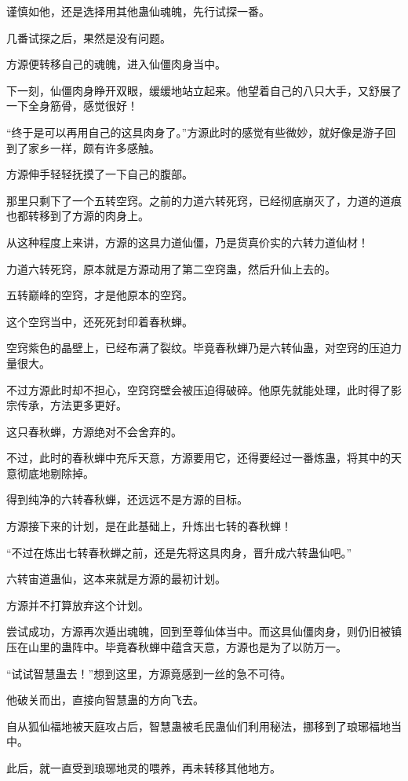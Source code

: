 \begin{this_body}
谨慎如他，还是选择用其他蛊仙魂魄，先行试探一番。

几番试探之后，果然是没有问题。

方源便转移自己的魂魄，进入仙僵肉身当中。

下一刻，仙僵肉身睁开双眼，缓缓地站立起来。他望着自己的八只大手，又舒展了一下全身筋骨，感觉很好！

“终于是可以再用自己的这具肉身了。”方源此时的感觉有些微妙，就好像是游子回到了家乡一样，颇有许多感触。

方源伸手轻轻抚摸了一下自己的腹部。

那里只剩下了一个五转空窍。之前的力道六转死窍，已经彻底崩灭了，力道的道痕也都转移到了方源的肉身上。

从这种程度上来讲，方源的这具力道仙僵，乃是货真价实的六转力道仙材！

力道六转死窍，原本就是方源动用了第二空窍蛊，然后升仙上去的。

五转巅峰的空窍，才是他原本的空窍。

这个空窍当中，还死死封印着春秋蝉。

空窍紫色的晶壁上，已经布满了裂纹。毕竟春秋蝉乃是六转仙蛊，对空窍的压迫力量很大。

不过方源此时却不担心，空窍窍壁会被压迫得破碎。他原先就能处理，此时得了影宗传承，方法更多更好。

这只春秋蝉，方源绝对不会舍弃的。

不过，此时的春秋蝉中充斥天意，方源要用它，还得要经过一番炼蛊，将其中的天意彻底地剔除掉。

得到纯净的六转春秋蝉，还远远不是方源的目标。

方源接下来的计划，是在此基础上，升炼出七转的春秋蝉！

“不过在炼出七转春秋蝉之前，还是先将这具肉身，晋升成六转蛊仙吧。”

六转宙道蛊仙，这本来就是方源的最初计划。

方源并不打算放弃这个计划。

尝试成功，方源再次遁出魂魄，回到至尊仙体当中。而这具仙僵肉身，则仍旧被镇压在山里的蛊阵中。毕竟春秋蝉中蕴含天意，方源也是为了以防万一。

“试试智慧蛊去！”想到这里，方源竟感到一丝的急不可待。

他破关而出，直接向智慧蛊的方向飞去。

自从狐仙福地被天庭攻占后，智慧蛊被毛民蛊仙们利用秘法，挪移到了琅琊福地当中。

此后，就一直受到琅琊地灵的喂养，再未转移其他地方。


\end{this_body}
